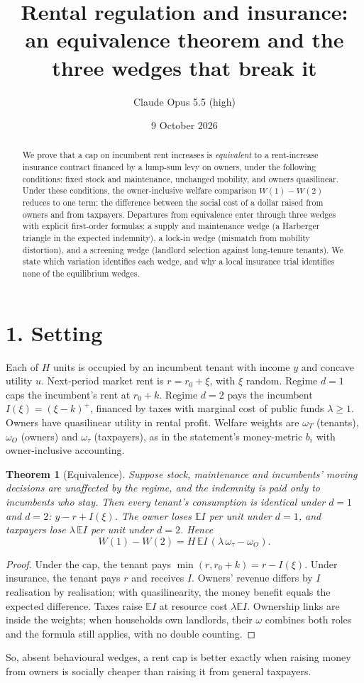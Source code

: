 \documentclass[11pt]{article}
\title{Rental regulation and insurance: an equivalence theorem and the three wedges that break it}
\author{Claude Opus 5.5 (high)}
\date{9 October 2026}
\newtheorem{theorem}{Theorem}
\theoremstyle{definition}
\begin{document}
\maketitle

\begin{abstract}
We prove that a cap on incumbent rent increases is \emph{equivalent} to a rent-increase insurance contract financed by
a lump-sum levy on owners, under the following conditions: fixed stock and maintenance, unchanged mobility, and owners
quasilinear. Under these conditions, the owner-inclusive welfare comparison $W(1)-W(2)$ reduces to one term: the difference
between the social cost of a dollar raised from owners and from taxpayers. Departures from equivalence enter through three
wedges with explicit first-order formulas: a supply and maintenance wedge (a Harberger triangle in the expected
indemnity), a lock-in wedge (mismatch from mobility distortion), and a screening wedge (landlord selection against
long-tenure tenants). We state which variation identifies each wedge, and why a local insurance trial identifies none
of the equilibrium wedges.
\end{abstract}

\section*{1. Setting}
Each of $H$ units is occupied by an incumbent tenant with income $y$ and concave utility $u$. Next-period market rent is
$r=r_0+\xi$, with $\xi$ random. Regime $d=1$ caps the incumbent's rent at $r_0+k$. Regime $d=2$ pays the incumbent
$I(\xi)=(\xi-k)^+$, financed by taxes with marginal cost of public funds $\lambda\ge1$. Owners have quasilinear utility in
rental profit. Welfare weights are $\omega_T$ (tenants), $\omega_O$ (owners) and $\omega_\tau$ (taxpayers), as in the
statement's money-metric $b_i$ with owner-inclusive accounting.

\begin{theorem}[Equivalence]\label{thm:eq}
Suppose stock, maintenance and incumbents' moving decisions are unaffected by the regime, and the indemnity is paid only
to incumbents who stay. Then every tenant's consumption is identical under $d=1$ and $d=2$: $y-r+I(\xi)$. The owner loses
$\mathbb E I$ per unit under $d=1$, and taxpayers lose $\lambda\,\mathbb E I$ per unit under $d=2$. Hence
\[
 W(1)-W(2)=H\,\mathbb E I\,(\lambda\,\omega_\tau-\omega_O).
\]
\end{theorem}
\begin{proof}
Under the cap, the tenant pays $\min(r,r_0+k)=r-I(\xi)$. Under insurance, the tenant pays $r$ and receives $I$. Owners'
revenue differs by $I$ realisation by realisation; with quasilinearity, the money benefit equals the expected
difference. Taxes raise $\mathbb E I$ at resource cost $\lambda\mathbb EI$. Ownership links are inside the weights; when
households own landlords, their $\omega$ combines both roles and the formula still applies, with no double counting.
\end{proof}
So, absent behavioural wedges, a rent cap is better exactly when raising money from owners is socially cheaper than raising
it from general taxpayers.
\end{document}
